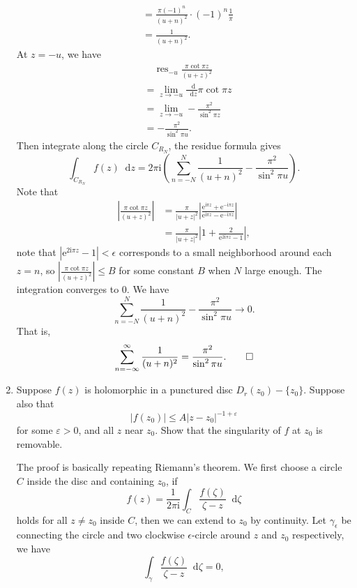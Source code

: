 \documentclass[11pt]{report}
\theoremstyle{mythm}
\let\oldendproof\endproof
\renewenvironment{proof}[1][\proofname]{%
  \oldproof[\normalfont \bfseries #1]%
}{\oldendproof}
\renewcommand*{\proofname}{Proof}
\theoremstyle{myans}
\newcommand{\mi}{\mathrm{i}}
\newcommand{\me}{\mathrm{e}}
\newcommand{\dd}{\mathop{}\!\mathrm{d}}
\DeclareMathOperator{\res}{res}
\begin{document}
\begin{enumerate}
\begin{proof}
\begin{align*}
      &= \frac{\pi (-1)^n}{(u+n)^2} \cdot (-1)^n \frac 1 \pi\\
      &= \frac 1{(u+n)^2}.
    \end{align*}
    At $z=-u$, we have
    \begin{align*}
      &\quad \res_{-u} \frac{\pi \cot \pi z}{(u+z)^2}\\
      &= \lim_{z\to -u} \frac{\dd}{\dd z} \pi \cot \pi z\\
      &= \lim_{z\to -u} -\frac{\pi^2} {\sin^2 \pi z}\\
      &= -\frac{\pi^2} {\sin^2 \pi u}.
    \end{align*}
    Then integrate along the circle $C_{R_N}$, the residue formula gives
    \[ \int_{C_{R_N}} f(z)\dd z = 2\pi \mi \left(\sum_{n=-N}^N \frac{1}{(u+n)^2} - \frac{\pi^2}{\sin^2\pi u}\right). \]
    Note that
    \begin{align*}
      \left|\frac{\pi \cot \pi z}{(u+z)^2}\right| &= \frac{\pi}{|u+z|^2} \left|
        \frac{\me^{\mi \pi z}+\me^{-\mi \pi z}}{\me^{\mi \pi z}-\me^{-\mi \pi z}} \right|\\
        &= \frac{\pi}{|u+z|^2} \left|
          1+\frac{2}{\me^{2\mi \pi z}-1} \right|,
    \end{align*}
    note that $|\me^{2\mi \pi z} - 1| < \epsilon$ corresponds to a small neighborhood
    around each $z=n$, 
    so $\left|\frac{\pi \cot \pi z}{(u+z)^2}\right| \leq B$ for some constant $B$ when $N$ large enough.
    The integration converges to $0$. We have
    \[ \sum_{n=-N}^N \frac{1}{(u+n)^2} - \frac{\pi^2}{\sin^2\pi u} \to 0. \]
    That is,
    \[ \sum_{n=-\infty}^\infty \frac{1}{(u+n)^2} = \frac{\pi^2}{\sin^2\pi u}. \qedhere \]
  \end{proof}
  \item Suppose $f(z)$ is holomorphic in a punctured disc $D_r(z_0) - \{z_0\}$. Suppose also that
  \[ |f(z_0)| \leq A |z-z_0|^{-1+\varepsilon} \]
  for some $\varepsilon>0$, and all $z$ near $z_0$. Show that the singularity of $f$ at $z_0$ is removable.
  \begin{proof}
    The proof is basically repeating Riemann's theorem. We first choose a circle $C$
    inside the disc and containing $z_0$, if
    \[ f(z) = \frac 1{2\pi \mi} \int_C \frac{f(\zeta)}{\zeta-z}\dd \zeta \]
    holds for all $z \neq z_0$ inside $C$, then we can extend to $z_0$ by continuity.
    Let $\gamma_\epsilon$ be connecting the circle and two clockwise $\epsilon$-circle around $z$ and $z_0$
    respectively, we have
    \[ \int_\gamma \frac{f(\zeta)}{\zeta-z}\dd \zeta = 0, \]

\end{proof}
\end{enumerate}
\end{document}
